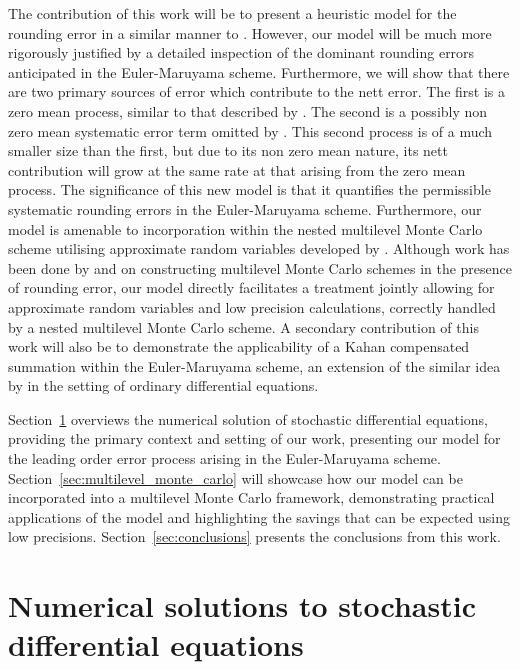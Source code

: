 \documentclass[9pt,a4paper,english]{extarticle}
\begin{document}
The contribution of this work will be to present a heuristic model for the rounding error in a similar manner to \citet{arciniega2003rounding}. However, our model will be much more rigorously justified by a detailed inspection of the dominant rounding errors anticipated in the Euler-Maruyama scheme. Furthermore, we will show that there are two primary sources of error which contribute to the nett error. The first is a zero mean process, similar to that described by \citet{arciniega2003rounding}. The second is a possibly non zero mean systematic error term omitted by \citet{arciniega2003rounding}. This second process is of a much smaller size than the first, but due to its non zero mean nature, its nett contribution will grow at the same rate at that arising from the zero mean process. The significance of this new model is that it quantifies the permissible systematic rounding errors in the Euler-Maruyama scheme. Furthermore, our model is amenable to incorporation within the nested multilevel Monte Carlo scheme utilising approximate random variables developed by \citeauthor{giles2020approximate} \citep{giles2020approximate,sheridan2020approximate_inverse,sheridan2020approximate_random,sheridan2020nested}. Although work has been done by \citet{brugger2014mixed} and \citet{omland2015exploiting} on constructing multilevel Monte Carlo schemes in the presence of rounding error, our model directly facilitates a treatment jointly allowing for approximate random variables and low precision calculations, correctly handled by a nested multilevel Monte Carlo scheme. A secondary contribution of this work will also be to demonstrate the applicability of a Kahan compensated summation within the Euler-Maruyama scheme, an extension of the similar idea by \citet{vitasek1969numerical} in the setting of ordinary differential equations. 

Section~\ref{sec:numerical_solutions_to_stochastic_differential_equations} overviews the numerical solution of stochastic differential equations, providing the primary context and setting of our work, presenting our model for the leading order error process arising in the Euler-Maruyama scheme. Section~\ref{sec:multilevel_monte_carlo} will showcase how our model can be incorporated into a multilevel Monte Carlo framework, demonstrating practical applications of the model and highlighting the savings that can be expected using low precisions. Section~\ref{sec:conclusions} presents the conclusions from this work. 

\section{Numerical solutions to stochastic differential equations}
\label{sec:numerical_solutions_to_stochastic_differential_equations}
\end{document}
